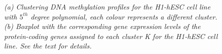 \begin{figure}[ht!]
     \begin{center}
    \end{center}
    \caption{\emph{(a) Clustering DNA methylation profiles for the H1-hESC cell line with $5^{th}$ degree polynomial, each colour represents a different cluster. (b) Boxplot with the corresponding gene expression levels of the protein-coding genes assigned to each cluster K for the H1-hESC cell line. See the text for details.}}
   \label{meth-H1-pic}
\end{figure}
